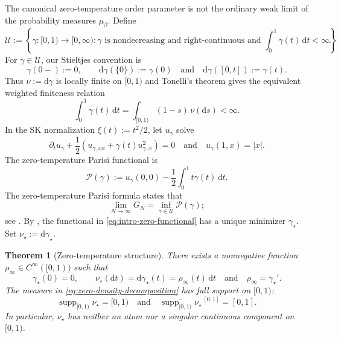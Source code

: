 \documentclass[10pt]{amsart}
\newtheorem{theorem}{Theorem}[section]
\theoremstyle{definition}
\theoremstyle{remark}
\numberwithin{equation}{section}
\newcommand{\1}{\mathbf 1}
\newcommand{\supp}{\operatorname{supp}}
\newcommand{\cU}{\mathcal U}
\newcommand{\cP}{\mathcal P}
\newcommand{\dd}{\,\mathrm d}
\begin{document}
The canonical zero-temperature order parameter is not the ordinary weak limit of the probability measures $\mu_\beta$. Define
\begin{equation}
 \cU:=\left\{\gamma:[0,1)\to[0,\infty):\gamma\text{ is nondecreasing and right-continuous and }\int_0^1\gamma(t)\dd t<\infty\right\}.
 \label{eq:intro-zero-class}
\end{equation}
For $\gamma\in\cU$, our Stieltjes convention is
\begin{equation*}
 \gamma(0-):=0,
 \qquad
 \mathrm d\gamma(\{0\}):=\gamma(0)
 \quad\text{and}\quad
 \mathrm d\gamma([0,t]):=\gamma(t).
\end{equation*}
Thus $\nu:=\mathrm d\gamma$ is locally finite on $[0,1)$ and Tonelli's theorem gives the equivalent weighted finiteness relation
\begin{equation*}
 \int_0^1\gamma(t)\dd t
 =\int_{[0,1)}(1-s)\,\nu(\mathrm d s)<\infty.
\end{equation*}
In the SK normalization $\xi(t):=t^2/2$, let $u_\gamma$ solve
\begin{equation}
 \partial_tu_\gamma+\frac12\left(u_{\gamma,xx}+\gamma(t)u_{\gamma,x}^2\right)=0
 \quad\text{and}\quad
 u_\gamma(1,x)=|x|.
 \label{eq:intro-zero-PDE}
\end{equation}
The zero-temperature Parisi functional is
\begin{equation}
 \cP(\gamma):=u_\gamma(0,0)-\frac12\int_0^1t\gamma(t)\dd t.
\label{eq:intro-zero-functional}
\end{equation}
The zero-temperature Parisi formula states that
\begin{equation*}
 \lim_{N\to\infty}G_N
 =\inf_{\gamma\in\cU}\cP(\gamma);
\end{equation*}
see \cite[Theorem 1]{AuffingerChenGroundState}. By \cite[Theorem 4]{ChenHandschyLerman}, the functional in \eqref{eq:intro-zero-functional} has a unique minimizer $\gamma_\star$. Set $\nu_\star:=\mathrm d\gamma_\star$.

\begin{theorem}[Zero-temperature structure]
\label{thm:zero-temperature}
There exists a nonnegative function $\rho_\infty\in C^\infty([0,1))$ such that
\begin{equation}
 \gamma_\star(0)=0,
 \qquad
 \nu_\star(\mathrm d t)=\mathrm d\gamma_\star(t)=\rho_\infty(t)\dd t
 \quad\text{and}\quad
 \rho_\infty=\gamma_\star'.
 \label{eq:zero-density-decomposition}
\end{equation}
The measure in \eqref{eq:zero-density-decomposition} has full support on $[0,1)$:
\begin{equation}
 \supp_{[0,1)}\nu_\star=[0,1)
 \quad\text{and}\quad
 \overline{\supp_{[0,1)}\nu_\star}^{\,[0,1]}=[0,1].
\label{eq:zero-main}
\end{equation}
In particular, $\nu_\star$ has neither an atom nor a singular continuous component on $[0,1)$.
\end{theorem}
\end{document}

